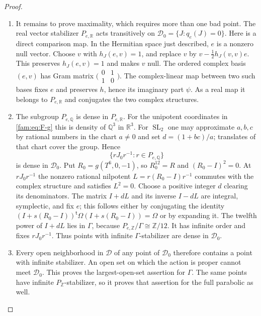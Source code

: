 \begin{proof}
\begin{enumerate}[label=\arabic*.,leftmargin=*]
\item It remains to prove maximality, which requires more than one bad point.
The real vector stabilizer $P_{e,\mathbb R}$ acts transitively on
$\mathcal D_0=\{J:q_e(J)=0\}$.  Here is a direct comparison map.  In the
Hermitian space just described, $e$ is a nonzero null vector.  Choose
$v$ with $h_J(e,v)=1$, and replace $v$ by
$v-\tfrac12h_J(v,v)e$.  This preserves $h_J(e,v)=1$ and makes $v$ null.
The ordered complex basis $(e,v)$ has Gram matrix
$\bigl(\begin{smallmatrix}0&1\\1&0\end{smallmatrix}\bigr)$.
The complex-linear map between two such bases fixes $e$ and preserves
$h$, hence its imaginary part $\psi$.  As a real map it belongs to
$P_{e,\mathbb R}$ and conjugates the two complex structures.

\item The subgroup $P_{e,\mathbb Q}$ is dense in $P_{e,\mathbb R}$.
For the unipotent coordinates in \eqref{fam:eq:F-g} this is density of
$\mathbb Q^3$ in $\mathbb R^3$.  For $\operatorname{SL}_2$ one may
approximate $a,b,c$ by rational numbers in the chart $a\ne0$ and set
$d=(1+bc)/a$; translates of that chart cover the group.  Hence
\[
 \{rJ_0r^{-1}:r\in P_{e,\mathbb Q}\}
\]
is dense in $\mathcal D_0$.
Put $R_0=g(T^6,0,-1)$, so $R_0^{12}=R$ and
$(R_0-I)^2=0$.  At $rJ_0r^{-1}$ the nonzero rational nilpotent
$L=r(R_0-I)r^{-1}$ commutes with the complex structure and satisfies
$L^2=0$.  Choose a positive integer $d$ clearing its denominators.
The matrix $I+dL$ and its inverse $I-dL$ are integral, symplectic, and
fix $e$; this follows either by conjugating the identity
$(I+s(R_0-I))^{\mathsf t}\Omega(I+s(R_0-I))=\Omega$ or by expanding it.
The twelfth power of $I+dL$ lies in $\Gamma$, because
$P_{e,\mathbb Z}/\Gamma\cong\mathbb Z/12$.  It has infinite order and
fixes $rJ_0r^{-1}$.  Thus points with infinite $\Gamma$-stabilizer are
dense in $\mathcal D_0$.

\item Every open neighborhood in $\mathcal D$ of any point of $\mathcal D_0$
therefore contains a point with infinite stabilizer.  An open set on
which the action is proper cannot meet $\mathcal D_0$.  This proves the
largest-open-set assertion for $\Gamma$.  The same points have infinite
$P_{\mathbb Z}$-stabilizer, so it proves that assertion for the full
parabolic as well.
\end{enumerate}
\end{proof}


